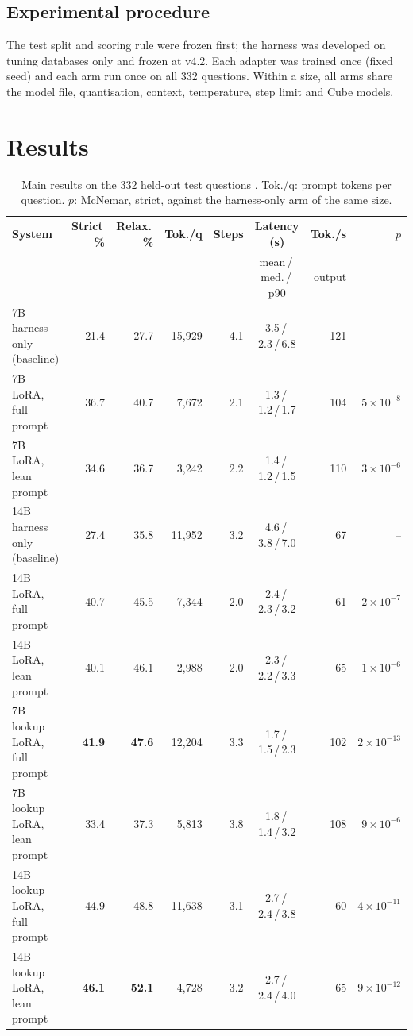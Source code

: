 \subsection{Experimental procedure}
The test split and scoring rule were frozen first; the harness was developed on tuning databases only and frozen at v4.2. Each adapter was trained once (fixed seed) and each arm run once on all 332 questions. Within a size, all arms share the model file, quantisation, context, temperature, step limit and Cube models.

\section{Results}

\begin{table}[!htbp]
\centering
\footnotesize
\caption{Main results on the 332 held-out test questions . Tok./q: prompt tokens per question. $p$: McNemar, strict, against the harness-only arm of the same size.}
\label{tab:main}
\setlength{\tabcolsep}{4pt}
\begin{tabularx}{\linewidth}{@{}Xrrrrcrr@{}}
\toprule
\textbf{System} & \textbf{Strict\,\%} & \textbf{Relax.\,\%} & \textbf{Tok./q} & \textbf{Steps} & \textbf{Latency (s)} & \textbf{Tok./s} & $p$\\
 & & & & & {\scriptsize mean\,/\,med.\,/\,p90} & {\scriptsize output} & \\
\midrule
7B harness only (baseline) & 21.4 & 27.7 & 15,929 & 4.1 & 3.5\,/\,2.3\,/\,6.8 & 121 & --\\
7B LoRA, full prompt & 36.7 & 40.7 & 7,672 & 2.1 & 1.3\,/\,1.2\,/\,1.7 & 104 & $5{\times}10^{-8}$\\
7B LoRA, lean prompt & 34.6 & 36.7 & 3,242 & 2.2 & 1.4\,/\,1.2\,/\,1.5 & 110 & $3{\times}10^{-6}$\\
\midrule
14B harness only (baseline) & 27.4 & 35.8 & 11,952 & 3.2 & 4.6\,/\,3.8\,/\,7.0 & 67 & --\\
14B LoRA, full prompt & 40.7 & 45.5 & 7,344 & 2.0 & 2.4\,/\,2.3\,/\,3.2 & 61 & $2{\times}10^{-7}$\\
14B LoRA, lean prompt & 40.1 & 46.1 & 2,988 & 2.0 & 2.3\,/\,2.2\,/\,3.3 & 65 & $1{\times}10^{-6}$\\
\midrule
7B lookup LoRA, full prompt & \textbf{41.9} & \textbf{47.6} & 12,204 & 3.3 & 1.7\,/\,1.5\,/\,2.3 & 102 & $2{\times}10^{-13}$\\
7B lookup LoRA, lean prompt & 33.4 & 37.3 & 5,813 & 3.8 & 1.8\,/\,1.4\,/\,3.2 & 108 & $9{\times}10^{-6}$\\
14B lookup LoRA, full prompt & 44.9 & 48.8 & 11,638 & 3.1 & 2.7\,/\,2.4\,/\,3.8 & 60 & $4{\times}10^{-11}$\\
14B lookup LoRA, lean prompt & \textbf{46.1} & \textbf{52.1} & 4,728 & 3.2 & 2.7\,/\,2.4\,/\,4.0 & 65 & $9{\times}10^{-12}$\\
\bottomrule
\end{tabularx}
\end{table}

